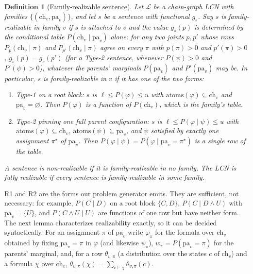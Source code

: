 \documentclass{article} %
\newtheorem{definition}{Definition}
\newcommand{\ch}{\mathrm{ch}}
\newcommand{\pa}{\mathrm{pa}}
\newcommand{\atoms}{\mathrm{atoms}}
\begin{document}
\begin{definition}[Family-realizable sentence]\label{def:realizable-app}
Let $\mathcal L$ be a chain-graph LCN with families $\{(\ch_v,\pa_v)\}$, and let $s$ be a sentence
with functional $g_s$. Say $s$ is \emph{family-realizable in family $v$} if $s$ is attached to $v$
and the value $g_s(p)$ is determined by the conditional table $P(\ch_v\mid\pa_v)$ \emph{alone}: for
any two joints $p,p'$ whose rows $P_p(\ch_v\mid\pi)$ and $P_{p'}(\ch_v\mid\pi)$ agree on every $\pi$
with $p(\pi)>0$ and $p'(\pi)>0$, $g_s(p)=g_s(p')$ (for a Type-2 sentence, whenever $P(\psi)>0$ and
$P'(\psi)>0$), whatever the parents' marginals $P(\pa_v)$ and $P'(\pa_v)$ may be. In particular,
$s$ is family-realizable in $v$ if it has one of the two forms:
\begin{enumerate}
  \item[\textup{(R1)}] \emph{Type-1 on a root block:} $s$ is $\ell\le P(\varphi)\le u$ with
    $\atoms(\varphi)\subseteq\ch_v$ and $\pa_v=\varnothing$. Then $P(\varphi)$ is a function of
    $P(\ch_v)$, which \emph{is} the family's table.
  \item[\textup{(R2)}] \emph{Type-2 pinning one full parent configuration:} $s$ is
    $\ell\le P(\varphi\mid\psi)\le u$ with $\atoms(\varphi)\subseteq\ch_v$,
    $\atoms(\psi)\subseteq\pa_v$, and $\psi$ satisfied by \emph{exactly one} assignment $\pi^\star$
    of $\pa_v$. Then $P(\varphi\mid\psi)=P(\varphi\mid\pa_v{=}\pi^\star)$ is a single row of the
    table.
\end{enumerate}
A sentence is \emph{non-realizable} if it is family-realizable in no family. The LCN is \emph{fully
realizable} if every sentence is family-realizable in some family.
\end{definition}

R1 and R2 are the forms our problem generator emits. They are sufficient, not necessary: for
example, $P(C\mid D)$ on a root block $\{C,D\}$, $P(C\mid D\wedge U)$ with $\pa_v=\{U\}$, and
$P(C\wedge U\mid U)$ are functions of one row but have neither form. The next lemma characterizes
realizability exactly, so it can be decided syntactically. For an assignment $\pi$ of $\pa_v$ write
$\varphi_\pi$ for the formula over $\ch_v$ obtained by fixing $\pa_v=\pi$ in $\varphi$ (and
likewise $\psi_\pi$), $w_\pi=P(\pa_v{=}\pi)$ for the parents' marginal, and, for a row $\theta_{v,\pi}$
(a distribution over the states $c$ of $\ch_v$) and a formula $\chi$ over $\ch_v$,
$\theta_{v,\pi}(\chi)=\sum_{c\models\chi}\theta_{v,\pi}(c)$.
\end{document}
